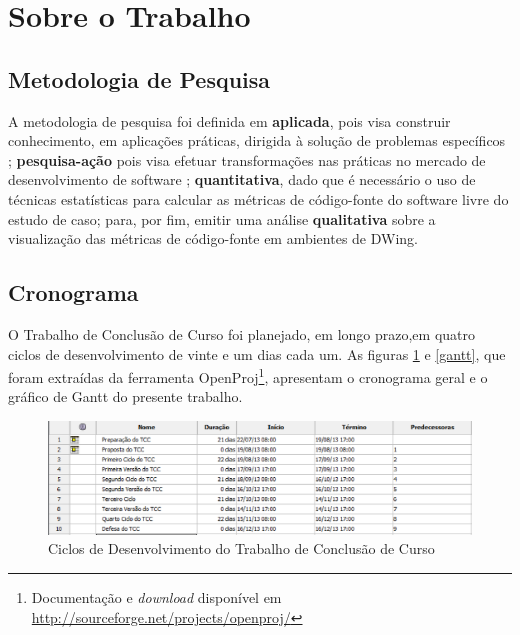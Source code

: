 
\section{Sobre o Trabalho}
\subsection {Metodologia de Pesquisa}
A metodologia de pesquisa foi definida em \textbf{aplicada}, pois visa construir 
conhecimento, em aplicações práticas, dirigida à solução de problemas 
específicos \cite{Gil2008}; \textbf{pesquisa-ação} pois visa efetuar 
transformações nas práticas no mercado de desenvolvimento de software 
\cite{brown1998}; \textbf{quantitativa}, dado que é necessário o uso de técnicas
estatísticas para calcular as métricas de código-fonte do software livre do 
estudo de caso; para, por fim, emitir uma análise \textbf{qualitativa} sobre a 
visualização das métricas de código-fonte em ambientes de DWing. 



\subsection{Cronograma}
O Trabalho de Conclusão de Curso foi planejado, em longo prazo,em quatro ciclos 
de desenvolvimento de vinte e um dias cada um. 
As figuras \ref{cronograma} e \ref{gantt}, que foram extraídas da ferramenta 
OpenProj\footnote{Documentação e \textit{download} disponível em 
\url{http://sourceforge.net/projects/openproj/}}, 
apresentam o cronograma geral e o gráfico de Gantt do presente trabalho.

\begin{figure}[h]
\centering
	\includegraphics[keepaspectratio=true,scale=0.7]{figuras/marcos.eps}
	\caption{Ciclos de Desenvolvimento do Trabalho de Conclusão de Curso}
	\label{cronograma}
\end{figure}


